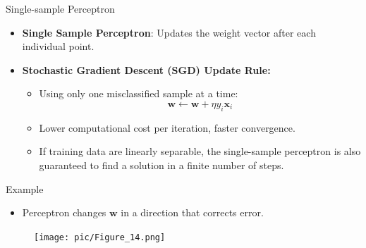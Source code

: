 \documentclass[serif, aspectratio=169]{beamer}
\begin{document}
\begin{frame}{Single-sample Perceptron}
    \begin{itemize}\itemsep1.5em
        \item \justifying \textbf{Single Sample Perceptron}: Updates the weight vector after each individual point.
        \item \textbf{Stochastic Gradient Descent (SGD) Update Rule:}
        \smallskip
        \begin{itemize}\itemsep1em
            \item Using only one misclassified sample at a time:
            \[
            \mathbf{w} \leftarrow \mathbf{w} + \eta y_i \mathbf{x}_i
            \]
            \item Lower computational cost per iteration, faster convergence.
            \item \justifying If training data are linearly separable, the single-sample perceptron is also guaranteed to find a solution in a finite number of steps.
        \end{itemize}
    \end{itemize}
\end{frame}

\begin{frame}{Example}
    \begin{itemize}
        \item Perceptron changes \(\mathbf{w}\) in a direction that corrects error.
    \end{itemize}
    \begin{figure}
        \centering
        \texttt{[image: pic/Figure\_14.png]}
    \end{figure}
    \vfill
\end{frame}
\end{document}
